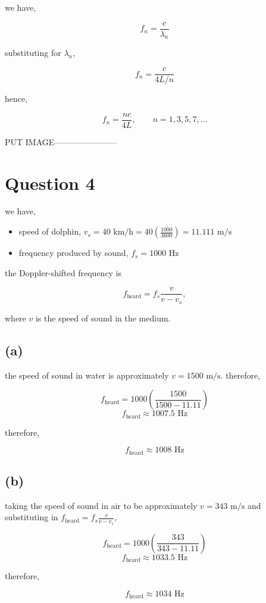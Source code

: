 \documentclass{article}
\begin{document}
we have,

\[
f_n
=
\frac{c}{\lambda_n}
\]

substituting for $\lambda_n$,

\[
f_n
=
\frac{c}{4L/n}
\]

hence,

\[
\boxed{
    f_n=\frac{nc}{4L},\qquad n=1,3,5,7,\ldots
    }
\]

PUT IMAGE-----------------------

\section{Question 4}

we have,

\begin{itemize}
    \item speed of dolphin, $v_s = 40\text{ km/h} = 40\left(\frac{1000}{3600}\right) = 11.111\text{ m/s}$
    \item frequency produced by sound, $f_s = 1000\text{ Hz}$
\end{itemize}

the Doppler-shifted frequency is

\[
f_{\text{heard}}=f_s\frac{v}{v-v_s},
\]

where $v$ is the speed of sound in the medium.

\subsection*{(a)}

the speed of sound in water is approximately $v=1500\text{ m/s}$. therefore,

\[
f_{\text{heard}}=1000\left(\frac{1500}{1500-11.11}\right)
\]
\[
f_{\text{heard}}\approx1007.5\text{ Hz}
\]

therefore,

\[
\boxed{f_{\text{heard}}\approx1008\text{ Hz}}
\]


\subsection*{(b)}

taking the speed of sound in air to be approximately $v=343\text{ m/s}$ and substituting in $f_{\text{heard}}=f_s\frac{v}{v-v_s}$,

\[
f_{\text{heard}}=1000\left(\frac{343}{343-11.11}\right)
\]
\[
f_{\text{heard}}\approx1033.5\text{ Hz}
\]

therefore,

\[
\boxed{f_{\text{heard}}\approx1034\text{ Hz}}
\]
\end{document}
